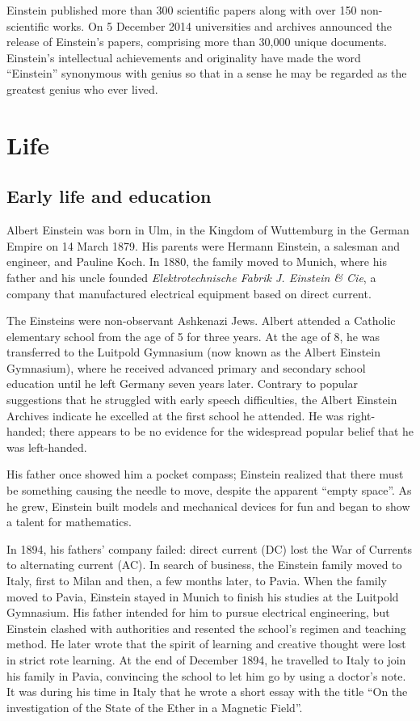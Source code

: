 \documentclass[titlepage]{article}
\begin{document}
Einstein published more than 300 scientific papers along with over
150 non-scientific works. On 5 December 2014 universities and
archives announced the release of Einstein's papers, comprising more
than 30,000 unique documents. Einstein's intellectual achievements and
originality have made the word ``Einstein'' synonymous with genius so
that in a sense he may be regarded as the greatest genius who ever lived.

\section{Life}
\subsection{Early life and education}

Albert Einstein was born in Ulm, in the Kingdom of Wuttemburg in
the German Empire on 14 March 1879. His parents were Hermann Einstein,
a salesman and engineer, and Pauline Koch. In 1880, the family moved
to Munich, where his father and his uncle founded
\emph{Elektrotechnische Fabrik J. Einstein \& Cie}, a company that
manufactured electrical equipment based on direct current.

The Einsteins were non-observant Ashkenazi Jews. Albert attended a
Catholic elementary school from the age of 5 for three years. At the
age of 8, he was transferred to the Luitpold Gymnasium (now known as
the Albert Einstein Gymnasium), where he received advanced primary and
secondary school education until he left Germany seven years later.
Contrary to popular suggestions that he struggled with early speech
difficulties, the Albert Einstein Archives indicate he excelled at
the first school he attended. He was right-handed; there appears to
be no evidence for the widespread popular belief that he was left-handed.

His father once showed him a pocket compass; Einstein realized that
there must be something causing the needle to move, despite the apparent
``empty space''. As he grew, Einstein built models and mechanical devices
for fun and began to show a talent for mathematics.

In 1894, his fathers' company failed: direct current (DC) lost the War of
Currents to alternating current (AC). In search of business, the Einstein
family moved to Italy, first to Milan and then, a few months later, to Pavia.
When the family moved to Pavia, Einstein stayed in Munich to finish his
studies at the Luitpold Gymnasium. His father intended for him to pursue
electrical engineering, but Einstein clashed with authorities and resented
the school's regimen and teaching method. He later wrote that the spirit of
learning and creative thought were lost in strict rote learning. At the end
of December 1894, he travelled to Italy to join his family in Pavia,
convincing the school to let him go by using a doctor's note. It was during
his time in Italy that he wrote a short essay with the title ``On the
investigation of the State of the Ether in a Magnetic Field''.
\end{document}
